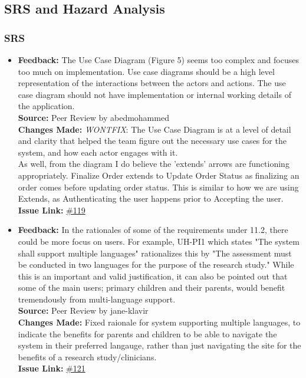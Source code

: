 \documentclass{article}
\begin{document}

\subsection{SRS and Hazard Analysis}

\subsubsection{SRS}
\begin{itemize}

  \item 
    \textbf{Feedback:} The Use Case Diagram (Figure 5) seems too complex and focuses too much on implementation. Use case diagrams should be a high level representation of the interactions between the actors and actions. The use case diagram should not have implementation or internal working details of the application. \\
    \textbf{Source:} Peer Review by abedmohammed\\
    \textbf{Changes Made:} \textit{WONTFIX}: The Use Case Diagram is at a level of detail and clarity that helped the team figure out the necessary use cases for the system, and how each actor engages with it.\\
    As well, from the diagram I do believe the 'extends' arrows are functioning appropriately. Finalize Order extends to Update Order Status as finalizing an order comes before updating order status. This is similar to how we are using Extends, as Authenticating the user happens prior to Accepting the user.\\
    \textbf{Issue Link:} \href{https://github.com/parishanizam/TeleHealth/issues/119}{\#119}
  
  \item 
    \textbf{Feedback:} In the rationales of some of the requirements under 11.2, there could be more focus on users. For example, UH-PI1 which states "The system shall support multiple languages" rationalizes this by "The assessment must be conducted in two languages for the purpose of the research study." While this is an important and valid justification, it can also be pointed out that some of the main users; primary children and their parents, would benefit tremendously from multi-language support. \\
    \textbf{Source:} Peer Review by jane-klavir\\
    \textbf{Changes Made:} Fixed raionale for system supporting multiple languages, to indicate the benefits for parents and children to be able to navigate the system in their preferred langauge, rather than just navigating the site for the benefits of a research study/clinicians.\\
    \textbf{Issue Link:} \href{https://github.com/parishanizam/TeleHealth/issues/121}{\#121}
  

\end{itemize}
\end{document}

